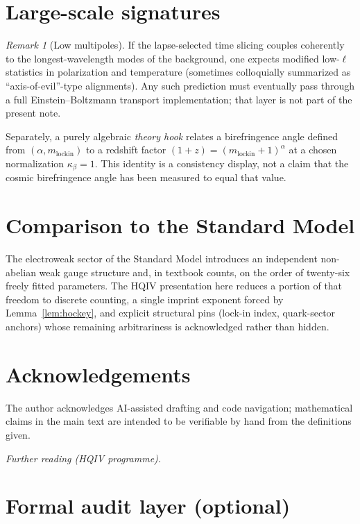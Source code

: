 \documentclass[11pt,a4paper]{article}
\theoremstyle{plain}
\theoremstyle{definition}
\theoremstyle{remark}
\newtheorem{remark}[theorem]{Remark}
\theoremstyle{plain}
\theoremstyle{definition}
\begin{document}
\section{Large-scale signatures}

\begin{remark}[Low multipoles]
If the lapse-selected time slicing couples coherently to the longest-wavelength modes of the background, one expects modified low-$\ell$ statistics in polarization and temperature (sometimes colloquially summarized as ``axis-of-evil''-type alignments).
Any such prediction must eventually pass through a full Einstein--Boltzmann transport implementation; that layer is not part of the present note.

Separately, a purely algebraic \emph{theory hook} relates a birefringence angle defined from $(\alpha,m_{\mathrm{lockin}})$ to a redshift factor $(1+z)=(m_{\mathrm{lockin}}+1)^{\alpha}$ at a chosen normalization $\kappa_{\beta}=1$.
This identity is a consistency display, not a claim that the cosmic birefringence angle has been measured to equal that value.
\end{remark}

\section{Comparison to the Standard Model}

The electroweak sector of the Standard Model introduces an independent non-abelian weak gauge structure and, in textbook counts, on the order of twenty-six freely fitted parameters.
The HQIV presentation here reduces a portion of that freedom to discrete counting, a single imprint exponent forced by Lemma~\ref{lem:hockey}, and explicit structural pins (lock-in index, quark-sector anchors) whose remaining arbitrariness is acknowledged rather than hidden.

\section*{Acknowledgements}
The author acknowledges AI-assisted drafting and code navigation; mathematical claims in the main text are intended to be verifiable by hand from the definitions given.

\medskip
\noindent\textit{Further reading (HQIV programme).} \cite{ettinger2026hqiv,brodie2026}

\appendix

\section{Formal audit layer (optional)}
\label{app:audit}
\end{document}
